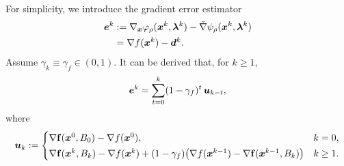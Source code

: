 \documentclass[10pt]{article}
\begin{document}
For simplicity, we introduce the gradient error estimator
\begin{align}
    \bm{e}^k
    &:= \nabla_{\bm{x}}\varphi_{\rho}(\bm{x}^k,\bm{\lambda}^k)
    - \tilde{\nabla}\psi_{\rho}(\bm{x}^k,\bm{\lambda}^k) \notag\\
    &= \nabla f(\bm{x}^k) - \bm{d}^k.
\end{align}
Assume \(\gamma_k \equiv \gamma_f \in (0,1)\). It can be derived that, for \(k \ge 1\),
\[
\bm{e}^k = \sum_{t=0}^{k}(1-\gamma_f)^t\,\bm{u}_{k-t},
\]
where
\begin{align}
\bm{u}_k :=
\begin{cases}
\nabla \mathbf f(\bm{x}^0,B_0) - \nabla f(\bm{x}^0), & k=0,\\[2pt]
\nabla \mathbf f(\bm{x}^k,B_k) - \nabla f(\bm{x}^k) 
+(1-\gamma_f)\!\left(\nabla f(\bm{x}^{k-1}) - \nabla \mathbf f(\bm{x}^{k-1},B_k) \right) & k\ge1.
\end{cases}
\end{align}
\end{document}
